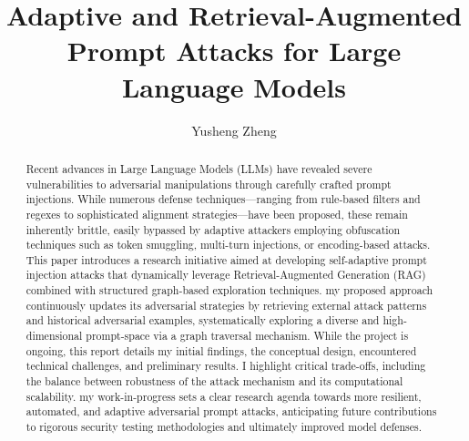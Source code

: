 \documentclass[manuscript,screen,review]{acmart}
\begin{document}
\title{Adaptive and Retrieval-Augmented Prompt Attacks for Large Language Models}

\author{Yusheng Zheng}


\begin{abstract}
Recent advances in Large Language Models (LLMs) have revealed severe vulnerabilities to adversarial manipulations through carefully crafted prompt injections. While numerous defense techniques—ranging from rule-based filters and regexes to sophisticated alignment strategies—have been proposed, these remain inherently brittle, easily bypassed by adaptive attackers employing obfuscation techniques such as token smuggling, multi-turn injections, or encoding-based attacks. This paper introduces a research initiative aimed at developing self-adaptive prompt injection attacks that dynamically leverage Retrieval-Augmented Generation (RAG) combined with structured graph-based exploration techniques. my proposed approach continuously updates its adversarial strategies by retrieving external attack patterns and historical adversarial examples, systematically exploring a diverse and high-dimensional prompt-space via a graph traversal mechanism. While the project is ongoing, this report details my initial findings, the conceptual design, encountered technical challenges, and preliminary results. I highlight critical trade-offs, including the balance between robustness of the attack mechanism and its computational scalability. my work-in-progress sets a clear research agenda towards more resilient, automated, and adaptive adversarial prompt attacks, anticipating future contributions to rigorous security testing methodologies and ultimately improved model defenses.
\end{abstract}
\end{document}

